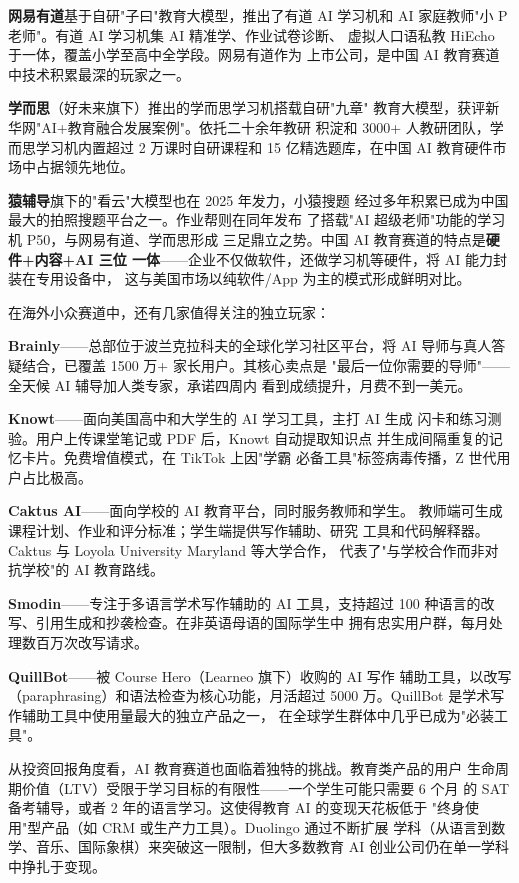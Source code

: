 \textbf{网易有道}基于自研"子曰"教育大模型，推出了有道 AI 学习机和
AI 家庭教师"小 P 老师"。有道 AI 学习机集 AI 精准学、作业试卷诊断、
虚拟人口语私教 HiEcho 于一体，覆盖小学至高中全学段。网易有道作为
上市公司，是中国 AI 教育赛道中技术积累最深的玩家之一。

\textbf{学而思}（好未来旗下）推出的学而思学习机搭载自研"九章"
教育大模型，获评新华网"AI+教育融合发展案例"。依托二十余年教研
积淀和 3000+ 人教研团队，学而思学习机内置超过 2 万课时自研课程和
15 亿精选题库，在中国 AI 教育硬件市场中占据领先地位。

\textbf{猿辅导}旗下的"看云"大模型也在 2025 年发力，小猿搜题
经过多年积累已成为中国最大的拍照搜题平台之一。作业帮则在同年发布
了搭载"AI 超级老师"功能的学习机 P50，与网易有道、学而思形成
三足鼎立之势。中国 AI 教育赛道的特点是\textbf{硬件+内容+AI 三位
一体}——企业不仅做软件，还做学习机等硬件，将 AI 能力封装在专用设备中，
这与美国市场以纯软件/App 为主的模式形成鲜明对比。

在海外小众赛道中，还有几家值得关注的独立玩家：

\textbf{Brainly}——总部位于波兰克拉科夫的全球化学习社区平台，将
AI 导师与真人答疑结合，已覆盖 1500 万+ 家长用户。其核心卖点是
"最后一位你需要的导师"——全天候 AI 辅导加人类专家，承诺四周内
看到成绩提升，月费不到一美元。

\textbf{Knowt}——面向美国高中和大学生的 AI 学习工具，主打 AI 生成
闪卡和练习测验。用户上传课堂笔记或 PDF 后，Knowt 自动提取知识点
并生成间隔重复的记忆卡片。免费增值模式，在 TikTok 上因"学霸
必备工具"标签病毒传播，Z 世代用户占比极高。

\textbf{Caktus AI}——面向学校的 AI 教育平台，同时服务教师和学生。
教师端可生成课程计划、作业和评分标准；学生端提供写作辅助、研究
工具和代码解释器。Caktus 与 Loyola University Maryland 等大学合作，
代表了"与学校合作而非对抗学校"的 AI 教育路线。

\textbf{Smodin}——专注于多语言学术写作辅助的 AI 工具，支持超过
100 种语言的改写、引用生成和抄袭检查。在非英语母语的国际学生中
拥有忠实用户群，每月处理数百万次改写请求。

\textbf{QuillBot}——被 Course Hero（Learneo 旗下）收购的 AI 写作
辅助工具，以改写（paraphrasing）和语法检查为核心功能，月活超过
5000 万。QuillBot 是学术写作辅助工具中使用量最大的独立产品之一，
在全球学生群体中几乎已成为"必装工具"。

从投资回报角度看，AI 教育赛道也面临着独特的挑战。教育类产品的用户
生命周期价值（LTV）受限于学习目标的有限性——一个学生可能只需要 6 个月
的 SAT 备考辅导，或者 2 年的语言学习。这使得教育 AI 的变现天花板低于
"终身使用"型产品（如 CRM 或生产力工具）。Duolingo 通过不断扩展
学科（从语言到数学、音乐、国际象棋）来突破这一限制，但大多数教育
AI 创业公司仍在单一学科中挣扎于变现。


